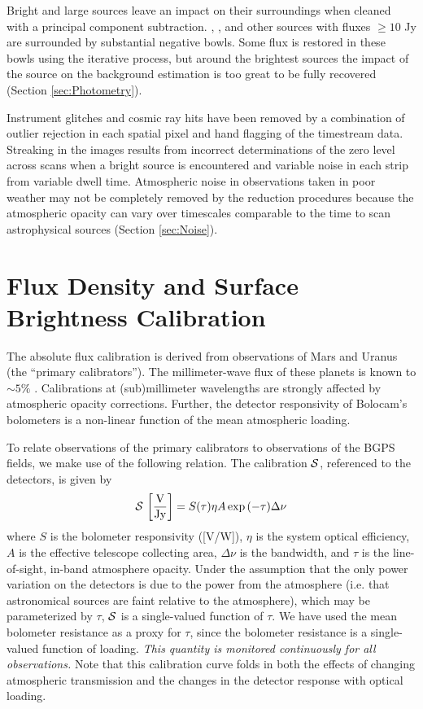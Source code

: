 \documentclass{emulateapj}
\begin{document}
Bright and large sources leave an impact on their surroundings when
cleaned with a principal component subtraction.  ,
, and other sources with fluxes $\geq 10$ Jy are
surrounded by substantial negative bowls.  Some flux is restored in
these bowls using the iterative process, but around the brightest
sources the impact of the source on the background estimation is too
great to be fully recovered (Section \ref{sec:Photometry}).

Instrument glitches and cosmic ray hits have been removed by a
combination of outlier rejection in each spatial pixel and hand
flagging of the timestream data.  Streaking in the images results from
incorrect determinations of the zero level across scans when a bright
source is encountered and variable noise in each strip from variable
dwell time.  Atmospheric noise in observations taken in poor weather
may not be completely removed by the reduction procedures because the
atmospheric opacity can vary over timescales comparable to the time to
scan astrophysical sources (Section \ref{sec:Noise}).

\section{Flux Density and Surface Brightness Calibration}
\label{sec:FluxCalibration}

The absolute flux calibration is derived from observations of Mars and
Uranus
(the ``primary calibrators'').  The millimeter-wave flux of these
planets is known to $\sim 5\%$ \citep{orton86,griffin93}.
Calibrations at (sub)millimeter wavelengths are strongly affected by
atmospheric opacity corrections.  Further, the detector responsivity
of Bolocam's bolometers is a non-linear function of the mean
atmospheric loading.

To relate observations of the primary calibrators to observations of
the BGPS fields, we make use of the following relation.  The
calibration ${\cal S}$, referenced to the detectors, is given by
\begin{equation}
\label{eq:Calibration}
{\cal S} \, \left[\mathrm{\frac{V}{Jy}}\right] = 
S(\tau) \eta A \exp{(-\tau)} \Delta\nu
\end{equation}
where $S$ is the bolometer responsivity ([V/W]), $\eta$ is the system
optical efficiency, $A$ is the effective telescope collecting area,
$\Delta \nu$ is the bandwidth, and $\tau$ is the line-of-sight,
in-band atmosphere opacity.  Under the assumption that the only power
variation on the detectors is due to the power from the atmosphere
(i.e.  that astronomical sources are faint relative to the
atmosphere), which may be parameterized by $\tau$, ${\cal S}$ is a
single-valued function of $\tau$.  We have used the mean bolometer
resistance as a proxy for $\tau$, since the bolometer resistance is a
single-valued function of loading.  {\it This quantity is monitored
continuously for all observations.}  Note that this calibration curve
folds in both the effects of changing atmospheric transmission and the
changes in the detector response with optical loading.
\end{document}
